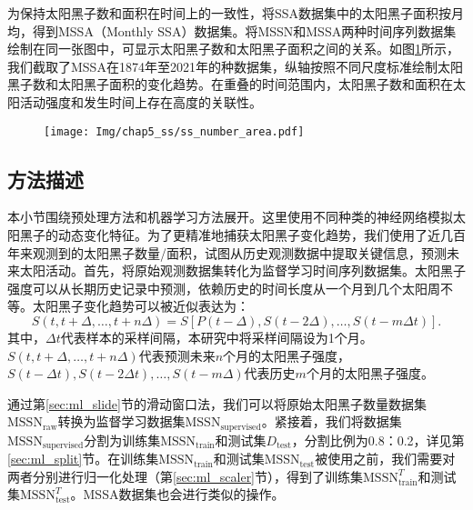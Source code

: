 为保持太阳黑子数和面积在时间上的一致性，将SSA数据集中的太阳黑子面积按月均，得到MSSA（Monthly SSA）数据集。将MSSN和MSSA两种时间序列数据集绘制在同一张图中，可显示太阳黑子数和太阳黑子面积之间的关系。如图\ref{fig:ss_number_area}所示，我们截取了MSSA在1874年至2021年的种数据集，纵轴按照不同尺度标准绘制太阳黑子数和太阳黑子面积的变化趋势。在重叠的时间范围内，太阳黑子数和面积在太阳活动强度和发生时间上存在高度的关联性。

\begin{figure}[!htbp]
  \vspace{-0.3cm}
  \centering
  \texttt{[image: Img/chap5\_ss/ss\_number\_area.pdf]}
  \vspace{-1.4cm}
  \label{fig:ss_number_area}
\end{figure}

\subsection{方法描述}\label{subsec:ss_method}

本小节围绕预处理方法和机器学习方法展开。这里使用不同种类的神经网络模拟太阳黑子的动态变化特征。为了更精准地捕获太阳黑子变化趋势，我们使用了近几百年来观测到的太阳黑子数量/面积，试图从历史观测数据中提取关键信息，预测未来太阳活动。首先，将原始观测数据集转化为监督学习时间序列数据集。太阳黑子强度可以从长期历史记录中预测，依赖历史的时间长度从一个月到几个太阳周不等。太阳黑子变化趋势可以被近似表达为：
\begin{equation}
  \label{eq:ss_sunspot_equation}
  S(t,t+\Delta,\ldots,t+n\Delta)=S[P(t-\Delta),S(t-2\Delta),\ldots,S(t-m\Delta t)].
\end{equation}
其中，$\Delta t$代表样本的采样间隔，本研究中将采样间隔设为1个月。$S(t,t+\Delta,\ldots,t+n\Delta)$代表预测未来$n$个月的太阳黑子强度，$S(t-\Delta t),S(t-2\Delta t),\ldots,S(t-m\Delta)$代表历史$m$个月的太阳黑子强度。

通过第\ref{sec:ml_slide}节的滑动窗口法，我们可以将原始太阳黑子数量数据集$\text{MSSN}_{\text{raw}}$转换为监督学习数据集$\text{MSSN}_{\text{supervised}}$。紧接着，我们将数据集$\text{MSSN}_{\text{supervised}}$分割为训练集$\text{MSSN}_{\text{train}}$和测试集$D_{\text{test}}$，分割比例为0.8：0.2，详见第\ref{sec:ml_split}节。在训练集$\text{MSSN}_{\text{train}}$和测试集$\text{MSSN}_{\text{test}}$被使用之前，我们需要对两者分别进行归一化处理（第\ref{sec:ml_scaler}节），得到了训练集$\text{MSSN}^T_{\text{train}}$和测试集$\text{MSSN}^T_{\text{test}}$。MSSA数据集也会进行类似的操作。

